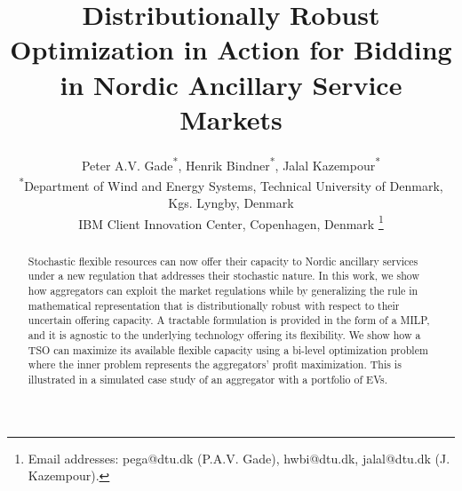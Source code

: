 \documentclass[conference]{IEEEtran}
\begin{document}
\title{Distributionally Robust Optimization in Action for Bidding in Nordic Ancillary Service Markets}

\author{Peter A.V. Gade\textsuperscript{*}\textsuperscript{\textdagger}, Henrik Bindner\textsuperscript{*}, Jalal Kazempour\textsuperscript{*} \\
    \textsuperscript{*}Department of Wind and Energy Systems, Technical University of Denmark, Kgs. Lyngby, Denmark \\
    \textsuperscript{\textdagger}IBM Client Innovation Center, Copenhagen, Denmark
    \thanks{
        Email addresses: pega@dtu.dk (P.A.V. Gade), hwbi@dtu.dk, jalal@dtu.dk (J. Kazempour).}%
    \vspace{-3mm}
}




\maketitle


\IEEEaftertitletext{\vspace{-0.8\baselineskip}}
\maketitle
\thispagestyle{plain}
\pagestyle{plain}
\begin{abstract}
    Stochastic flexible resources can now offer their capacity to Nordic ancillary services under a new regulation that addresses their stochastic nature. In this work, we show how aggregators can exploit the market regulations while by generalizing the rule in mathematical representation that is distributionally robust with respect to their uncertain offering capacity. A tractable formulation is provided in the form of a \ac{MILP}, and it is agnostic to the underlying technology offering its flexibility. We show how a \ac{TSO} can maximize its available flexible capacity using a bi-level optimization problem where the inner problem represents the aggregators' profit maximization. This is illustrated in a simulated case study of an aggregator with a portfolio of \acp{EV}.
\end{abstract}
\end{document}
